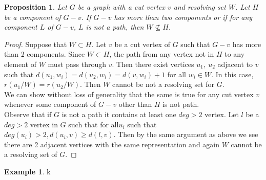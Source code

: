 \documentclass[11pt]{amsart}
\theoremstyle{plain}  %
\newtheorem{prop}[thm]{Proposition}
\theoremstyle{definition}
\newtheorem{ex}[thm]{Example}
\theoremstyle{remark}
\numberwithin{equation}{thm}
\begin{document}
\begin{prop}
 Let $G$ be a graph with a cut vertex $v$ and resolving set $W$. Let $H$ be a component of $G-v$. 
 If $G-v$ has more than two components or if for any component $L$ of $G-v$, $L$ is not a path, then $W\nsubseteq H$.
\end{prop}
\begin{proof}
 Suppose that $W \subset H$. 
 Let $v$ be a cut vertex of $G$ such that $G-v$ has more than 2 components. Since $W \subset H$, the path from any vertex not in $H$ to any element of $W$ must pass through $v$.
 Then there exist vertices $u_1,\ u_2$ adjacent to $v$ such that $d(u_1, w_i) = d(u_2, w_i) = d(v, w_i) + 1$ for all $w_i \in W$.
 In this case, $r(u_1/W) = r(u_2/W)$. Then $W$ cannot be not a resolving set for $G$.\\
 We can show without loss of generality that the same is true for any cut vertex $v$ whenever some component of $G-v$ other than $H$ is not path.\\
 Observe that if $G$ is not a path it contains at least one $deg > 2$ vertex. 
 Let $l$ be a $deg > 2$ vertex in $G$ such that for all$u_i$ such that $deg(u_i)>2, d(u_i, v) \geq d(l, v)$. 
 Then by the same argument as above we see there are 2 adjacent vertices with the same representation and again $W$ cannot be a resolving set of $G$.
 \end{proof}

 \begin{ex}
k
\end{ex}
\end{document}
